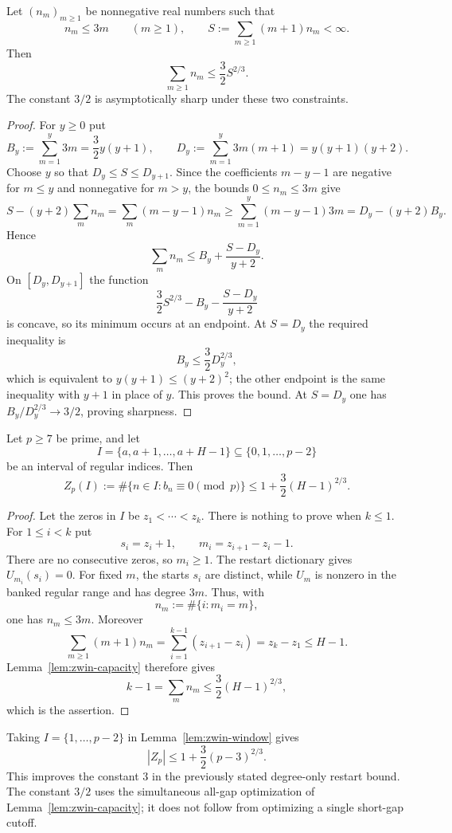 \begin{lemma}\label{lem:zwin-capacity}
Let $(n_m)_{m\geq1}$ be nonnegative real numbers such that
\[
 n_m\leq 3m
 \qquad(m\geq1),
 \qquad
 S:=\sum_{m\geq1}(m+1)n_m<\infty.
\]
Then
\[
 \sum_{m\geq1}n_m\leq \frac32 S^{2/3}.
\]
The constant $3/2$ is asymptotically sharp under these two constraints.
\end{lemma}

\begin{proof}
For $y\geq0$ put
\[
 B_y:=\sum_{m=1}^y3m=\frac32y(y+1),
 \qquad
 D_y:=\sum_{m=1}^y3m(m+1)=y(y+1)(y+2).
\]
Choose $y$ so that $D_y\leq S\leq D_{y+1}$.  Since the coefficients
$m-y-1$ are negative for $m\leq y$ and nonnegative for $m>y$, the bounds
$0\leq n_m\leq3m$ give
\[
 S-(y+2)\sum_m n_m
 =\sum_m(m-y-1)n_m
 \geq\sum_{m=1}^y(m-y-1)3m
 =D_y-(y+2)B_y.
\]
Hence
\[
 \sum_m n_m\leq B_y+\frac{S-D_y}{y+2}.
\]
On $[D_y,D_{y+1}]$ the function
\[
 \frac32S^{2/3}-B_y-\frac{S-D_y}{y+2}
\]
is concave, so its minimum occurs at an endpoint.  At $S=D_y$ the required
inequality is
\[
 B_y\leq\frac32D_y^{2/3},
\]
which is equivalent to $y(y+1)\leq(y+2)^2$; the other endpoint is the same
inequality with $y+1$ in place of $y$.  This proves the bound.  At
$S=D_y$ one has $B_y/D_y^{2/3}\to3/2$, proving sharpness.
\end{proof}

\begin{lemma}\label{lem:zwin-window}
Let $p\geq7$ be prime, and let
\[
 I=\{a,a+1,\ldots,a+H-1\}\subseteq\{0,1,\ldots,p-2\}
\]
be an interval of regular indices.  Then
\[
 Z_p(I):=\#\{n\in I:b_n\equiv0\pmod p\}
 \leq 1+\frac32(H-1)^{2/3}.
\]
\end{lemma}

\begin{proof}
Let the zeros in $I$ be $z_1<\cdots<z_k$.  There is nothing to prove when
$k\leq1$.  For $1\leq i<k$ put
\[
 s_i=z_i+1,
 \qquad
 m_i=z_{i+1}-z_i-1.
\]
There are no consecutive zeros, so $m_i\geq1$.  The restart dictionary gives
$U_{m_i}(s_i)=0$.  For fixed $m$, the starts $s_i$ are distinct, while
$U_m$ is nonzero in the banked regular range and has degree $3m$.  Thus, with
\[
 n_m:=\#\{i:m_i=m\},
\]
one has $n_m\leq3m$.  Moreover
\[
 \sum_{m\geq1}(m+1)n_m
 =\sum_{i=1}^{k-1}(z_{i+1}-z_i)
 =z_k-z_1
 \leq H-1.
\]
Lemma~\ref{lem:zwin-capacity} therefore gives
\[
 k-1=\sum_mn_m\leq\frac32(H-1)^{2/3},
\]
which is the assertion.
\end{proof}

\begin{remark}\label{lem:zwin-global}
Taking $I=\{1,\ldots,p-2\}$ in Lemma~\ref{lem:zwin-window} gives
\[
 |Z_p|\leq1+\frac32(p-3)^{2/3}.
\]
This improves the constant $3$ in the previously stated degree-only restart
bound.  The constant $3/2$ uses the simultaneous all-gap optimization of
Lemma~\ref{lem:zwin-capacity}; it does not follow from optimizing a single
short-gap cutoff.
\end{remark}

